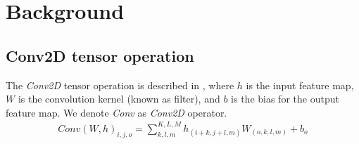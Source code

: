 \section{Background}
\label{sec:background}
\subsection{Conv2D tensor operation}
The \emph{Conv2D} tensor operation is described in , where $h$ is the input feature map, $W$ is the convolution kernel (known as filter), and $b$ is the bias for the output feature map\cite{goodfellow2016deep}. We denote \emph{Conv} as \emph{Conv2D} operator.
\begin{eqnarray} \label{eq:conv2D}
Conv\left(W,h\right)_{i,j,o}=\sum_{k,l,m}^{K,L,M} h_{(i+k,j+l,m)} W_{(o,k,l,m)}+b_{o}
\end{eqnarray}